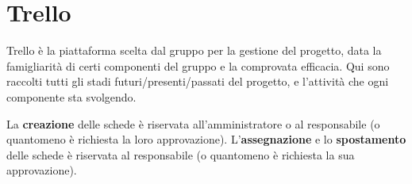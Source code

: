 \chapter{Trello}

Trello è la piattaforma scelta dal gruppo per la gestione del progetto, data la famigliarit\`{a} di certi componenti del gruppo e la comprovata efficacia.
Qui sono raccolti tutti gli stadi futuri/presenti/passati del progetto, e l'attivit\`{a} che ogni componente sta svolgendo.

La \textbf{creazione} delle schede è riservata all'amministratore o al responsabile (o quantomeno è richiesta la loro approvazione).
L'\textbf{assegnazione} e lo \textbf{spostamento} delle schede è riservata al responsabile (o quantomeno è richiesta la sua approvazione).
